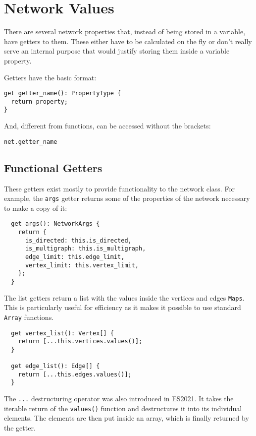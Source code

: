 \chapter{Network Values}
There are several network properties that, instead of being stored in a variable, have getters to them. These either have to be calculated on the fly or don't really serve an internal purpose that would justify storing them inside a variable property.

Getters have the basic format:

\begin{verbatim}
get getter_name(): PropertyType {
  return property;
}
\end{verbatim}

And, different from functions, can be accessed without the brackets:

\begin{verbatim}
net.getter_name
\end{verbatim}

\section{Functional Getters}
These getters exist mostly to provide functionality to the network class.
For example,
the \texttt{args} getter returns some of the properties of the network necessary to make a copy of it:

\begin{verbatim}
  get args(): NetworkArgs {
    return {
      is_directed: this.is_directed,
      is_multigraph: this.is_multigraph,
      edge_limit: this.edge_limit,
      vertex_limit: this.vertex_limit,
    };
  }
\end{verbatim}

The list getters return a list with the values inside the vertices and edges \texttt{Maps}.
This is particularly useful for efficiency as it makes it possible to use standard \texttt{Array} functions.

\begin{verbatim}
  get vertex_list(): Vertex[] {
    return [...this.vertices.values()];
  }

  get edge_list(): Edge[] {
    return [...this.edges.values()];
  }
\end{verbatim}

The \texttt{...} destructuring operator was also introduced in ES2021.
It takes the iterable return of the \texttt{values()}
function and destructures it into its individual elements.
The elements are then put inside an array, which is finally returned by the getter.

